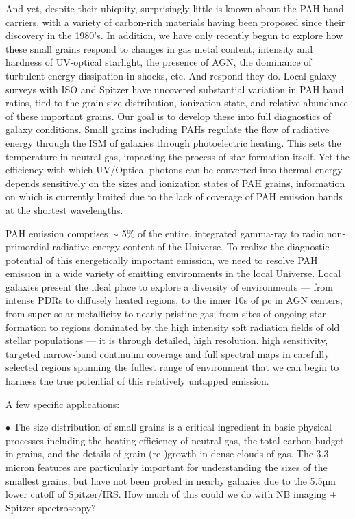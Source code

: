 \documentclass[12pt]{article}
\begin{document}
And yet, despite their ubiquity, surprisingly little is known about the PAH band carriers, with a variety of carbon-rich materials having been proposed since their discovery in the 1980’s.  In addition, we have only recently begun to explore how these small grains respond to changes in gas metal content, intensity and hardness of UV-optical starlight, the presence of AGN, the dominance of turbulent energy dissipation in shocks, etc.  And respond they do.  Local galaxy surveys with ISO and Spitzer have uncovered substantial variation in PAH band ratios, tied to the grain size distribution, ionization state, and relative abundance of these important grains.   Our goal is to develop these into full diagnostics of galaxy conditions.
Small grains including PAHs regulate the flow of radiative energy through the ISM of galaxies through photoelectric heating.  This sets the temperature in neutral gas, impacting the process of star formation itself.  Yet the efficiency with which UV/Optical photons can be converted into thermal energy depends sensitively on the sizes and ionization states of PAH grains, information on which is currently limited due to the lack of coverage of PAH emission bands at the shortest wavelengths.

PAH emission comprises $\sim$ 5\% of the entire, integrated gamma-ray to radio non-primordial radiative energy content of the Universe.  To realize the diagnostic potential of this energetically important emission, we need to resolve PAH emission in a wide variety of emitting environments in the local Universe.   Local galaxies present the ideal place to explore a diversity of environments — from intense PDRs to diffusely heated regions, to the inner 10s of pc in AGN centers; from super-solar metallicity to nearly pristine gas; from sites of ongoing star formation to regions dominated by the high intensity soft radiation fields of old stellar populations — it is through detailed, high resolution, high sensitivity, targeted narrow-band continuum coverage and full spectral maps in carefully selected regions spanning the fullest range of environment that we can begin to harness the true potential of this relatively untapped emission.

\noindent A few specific applications:

\noindent $\bullet$ The size distribution of small grains is a critical ingredient in basic physical processes including the heating efficiency of neutral gas, the total carbon budget in grains, and the details of grain (re-)growth in dense clouds of gas.  The 3.3 micron features are particularly important for understanding the sizes of the smallest grains, but have not been probed in nearby galaxies due to the 5.5µm lower cutoff of Spitzer/IRS.  How much of this could we do with NB imaging + Spitzer spectroscopy?
\end{document}
